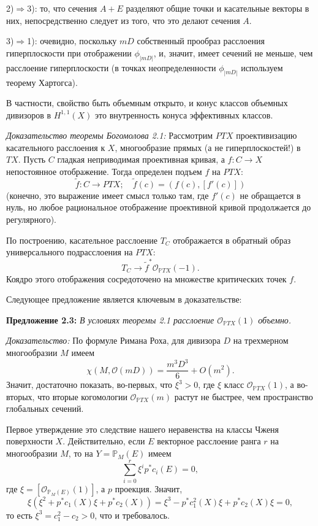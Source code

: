 2)${}\Rightarrow{}$3): то, что сечения $A+E$ разделяют общие точки и касательные
векторы в них,
непосредственно следует из того, что это делают сечения $A$.

3)${}\Rightarrow{}$1): очевидно, поскольку $mD$ собственный прообраз расслоения
гиперплоскости при отображении $\phi_{|mD|}$, и, значит, имеет
сечений не меньше, чем расслоение гиперплоскости (в точках неопределенности $\phi_{|mD|}$
используем теорему Хартогса).

\medskip
В частности, свойство быть объемным открыто, и конус классов
объемных дивизоров в $H^{1,1}(X)$ это внутренность конуса эффективных
классов.


{\it Доказательство теоремы Богомолова 2.1:}
Рассмотрим $P TX$ проективизацию касательного расслоения к $X$, многообразие прямых (а не гиперплоскостей!) в $TX$. Пусть $C$ гладкая
неприводимая проективная кривая, а $f\colon C\rightarrow X$ непостоянное отображение. Тогда определен подъем $f$ на $P TX$:
$$
\tilde{f}\colon C\rightarrow P TX;\quad \tilde{f}(c)=(f(c),[f'(c)])
$$
(конечно, это выражение имеет смысл только там, где $f'(c)$ не обращается
в нуль, но любое рациональное отображение проективной кривой продолжается
до регулярного).

По построению, касательное расслоение $T_C$ отображается в обратный образ
универсального подрасслоения на $P TX$:
$$
T_C\rightarrow \tilde{f}^*\mathcal{O}_{\mathbb{P} TX}(-1).
$$
Коядро этого отображения сосредоточено на множестве критических точек $f$.

Следующее предложение является ключевым в доказательстве:

\medskip
{\bf Предложение 2.3:}
{\it
В условиях теоремы \textup{2.1} расслоение $\mathcal{O}_{\mathbb{P} TX}(1)$ объемно.
}


\medskip
{\it Доказательство:}
По формуле Римана Роха,
для дивизора $D$ на трехмерном многообразии $M$ имеем
$$
\chi(M,\mathcal{O}(mD))=\frac{m^3D^3}{6} + O(m^2).
$$
Значит, достаточно показать, во-первых, что $\xi^3>0$, где $\xi$
класс $\mathcal{O}_{\mathbb{P} TX}(1)$, а во-вторых, что вторые когомологии $\mathcal{O}_{\mathbb{P} TX}(m)$
растут не быстрее,
чем пространство глобальных сечений.

Первое утверждение это следствие нашего неравенства на классы Чженя
поверхности $X$. Действительно, если $E$ векторное расслоение ранга $r$ на
многообразии $M$,
то на $Y=\mathbb{P}_M(E)$ имеем
$$
\sum_{i=0}^{r}\xi^ip^*c_i(E)=0,
$$
где $\xi=[\mathcal{O}_{\mathbb{P}_M(E)}(1)]$, а $p$ проекция. Значит,
$$
\xi(\xi^2+p^*c_1(X)\xi+p^*c_2(X))=\xi^3-p^*c_1^2(X)\xi+p^*c_2(X)\xi=0,
$$
то есть $\xi^3=c_1^2-c_2>0$, что и требовалось.

